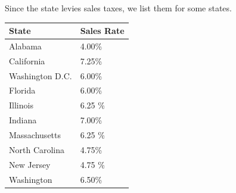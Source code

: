 \documentclass{article}
\begin{document}
    \begin{example}
      Since the state levies sales taxes, we list them for some states. 
      \begin{center}
      \begin{tabular}{l|l}
          State & Sales Rate \\
          \hline
          Alabama & 4.00\% \\
          California & 7.25\% \\
          Washington D.C. & 6.00\% \\
          Florida & 6.00\% \\
          Illinois & 6.25 \%\\
          Indiana & 7.00\%\\
          Massachusetts & 6.25 \%\\
          North Carolina & 4.75\%\\
          New Jersey & 4.75 \%\\
          Washington & 6.50\%
      \end{tabular}
      \end{center}
    \end{example}
\end{document}
